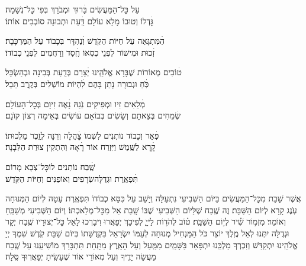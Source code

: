 עַל כׇּל־הַמַּעֲשִׂים \hfill בָּׄרוּךְ וּמְבֹרָךְ בְּפִי כׇּל־נְשָׁמָה׃ \\
גׇּׄדְלוֹ וְטוּבוֹ מָלֵא עוֹלָם \hfill דַּֽׄעַת וּתְבוּנָה סוֹבְבִים אוֹתוֹ׃

הַׄמִּתְגָּאֶה עַל חַיּוֹת הַקֹּֽדֶשׁ \hfill וְׄנֶהְדָּר בְּכָבוֹד עַל הַמֶּרְכָּבָה׃\\
זְׄכוּת וּמִישׁוֹר לִפְנֵי כִסְאוֹ \hfill חֶֽׄסֶד וְרַחֲמִים לִפְנֵי כְבוֹדוֹ׃

טׄוֹבִים מְאוֹרוֹת שֶׁבָּרָא אֱלֹהֵֽינוּ \hfill יְׄצָרָם בְּדַֽעַת בְּבִינָה וּבְהַשְׂכֵּל׃\\
כֹּֽׄחַ וּגְבוּרָה נָתַן בָּהֶם \hfill לִׄהְיוֹת מוֹשְׁלִים בְּקֶֽרֶב תֵּבֵל׃

מְׄלֵאִים זִיו וּמְפִיקִים נֹֽגַהּ \hfill נָׄאֶה זִיוָם בְּכׇל־הָעוֹלָם׃ \\
שְׂׄמֵחִים בְּצֵאתָם וְשָׂשִׂים בְּבוֹאָם \hfill עׄוֹשִׂים בְּאֵימָה רְצוֹן קוׂנָם׃

פְּׄאֵר וְכָבוֹד נוֹתְנִים לִשְׁמוֹ \hfill צׇׄהֳלָה וְרִנָּה לְזֵֽכֶר מַלְכוּתוֹ׃ \\
קָׄרָא לַשֶּֽׁמֶשׁ וַיִּזְרַח אוֹר \hfill רָׄאָה וְהִתְקִין צוּרַת הַלְּבָנָה׃

שֶֽׁׄבַח נוֹתְנִים לוֹ\hfill כׇּל־צְבָא מָרוֹם \\ תִּׄפְאֶֽרֶת וּגְדֻלָּה\hfill שְׂרָפִים וְאוֹפַנִּים וְחַיּוֹת הַקֹּֽדֶשׁ׃

אֲשֶׁר שָׁבַת מִכׇּל־הַמַּעֲשִׂים בַּיּוֹם הַשְּׁבִיעִי נִתְעַלָּה וְיָשַׁב עַל כִּסֵּא כְבוֹדוֹ \middot תִּפְאֶֽרֶת עָטָה לְיוֹם הַמְּנוּחָה עֹֽנֶג קָרָא לְיוֹם הַשַּׁבָּת׃
זֶה שֶֽׁבַח שֶׁלַּיּוֹם הַשְּׁבִיעִי שֶׁבּוֹ שָֽׁבַת אֵל מִכׇּל־מְלַאכְתּוֹ׃ וְיוֹם הַשְּׁבִיעִי מְשַׁבֵּֽחַ וְאוֹמֵר׃
%
מִזְמ֥וֹר שִׁ֗יר לְי֣וֹם הַשַּׁבָּֽת׃ ט֗וֹב לְהֹד֥וֹת לַייָ֑
לְפִיכָךְ יְפָאֲרוּ וִיבָרְכוּ לָאֵל כׇּל־יְצוּרָיו \middot שֶֽׁבַח יְקָר וּגְדֻלָּה יִתְּנוּ לְאֵל מֶֽלֶךְ יוֹצֵר כֹּל \middot הַמַּנְחִיל מְנוּחָה לְעַמּוֹ יִשְׂרָאֵל בִּקְדֻשָּׁתוֹ בְּיוֹם שַׁבַּת קֹֽדֶשׁ׃
שִׁמְךָ יְיָ אֱלֹהֵֽינוּ יִתְקַדַּשׁ \middot וְזִכְרְךָ מַלְכֵּֽנוּ יִתְפָּאַר בַּשָּׁמַֽיִם מִמַּֽעַל וְעַל הָאָֽרֶץ מִתָּֽחַת׃ תִּתְבָּרַךְ מוֹשִׁיעֵֽנוּ עַל שֶֽׁבַח מַעֲשֵׂה יָדֶֽיךָ וְעַל מְאוֹרֵי אוֹר שֶׁעָשִֽׂיתָ יְפָאֲרֽוּךָ סֶּֽלָה׃


\label{tisbarach}
\yotzerhameoros

\ahavaraba

\shema

\veahavta

\vehaya

\vayomer{}

\emesveyatziv

\ezrasavoseinu

